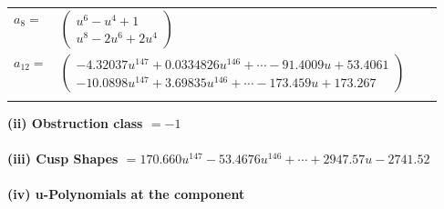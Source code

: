 \documentclass[1p]{elsarticle_modified}
\theoremstyle{definition}
\begin{document}
\begin{tabular}{m{7pt} m{180pt} m{7pt} m{180pt} }
\flushright $a_{8}=$&$\begin{pmatrix}u^6- u^4+1\\u^8-2 u^6+2 u^4\end{pmatrix}$ \\
\flushright $a_{12}=$&$\begin{pmatrix}-4.32037 u^{147}+0.0334826 u^{146}+\cdots-91.4009 u+53.4061\\-10.0898 u^{147}+3.69835 u^{146}+\cdots-173.459 u+173.267\end{pmatrix}$\\&\end{tabular}
\flushleft \textbf{(ii) Obstruction class $= -1$}\\~\\
\flushleft \textbf{(iii) Cusp Shapes $= 170.660 u^{147}-53.4676 u^{146}+\cdots+2947.57 u-2741.52$}\\~\\
\newpage\renewcommand{\arraystretch}{1}
\flushleft \textbf{(iv) u-Polynomials at the component}\newline \\
\end{document}
